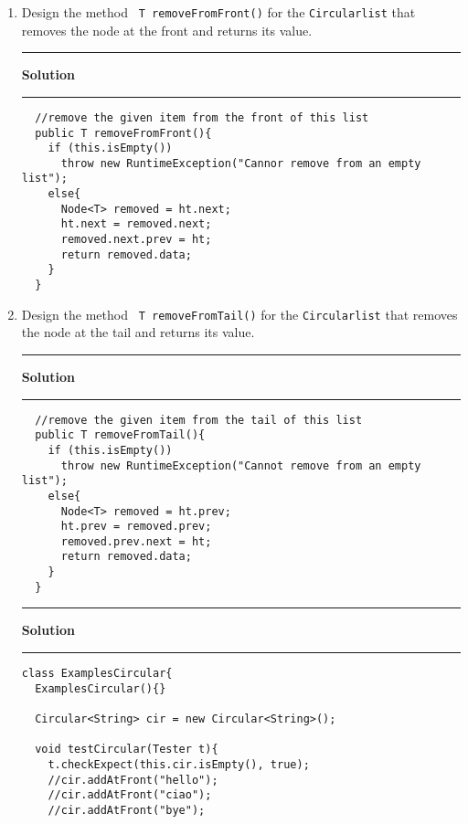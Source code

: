 \documentclass[11pt]{article}
\def\thel{\noindent\rule{2.5cm}{.5pt}}
\def\begsol#1{\thel {\bf Solution} \thel}\def\endsol{\relax}
\newcounter{Pctr}
\newenvironment{problem}{\stepcounter{Pctr}%
\begin{description}
\item[\noindent{\bf Problem} \arabic{Pctr}]
\end{description}}{\relax}
\begin{document}
\begin{problem}
\begin{enumerate}
\begsol{\vspace{0.5in}}
\begin{verbatim}
  //add the given item to the tail of this list
  public void addAtTail(T t){
    Node<T> oldLast = this.ht.prev;
    Node<T> n = new Node<T>(t, oldLast, this.ht);
    this.ht.prev = n;
    oldLast.next = n;
  }
\end{verbatim}
\endsol

\newpage
\item Design the method \texttt{ T removeFromFront()} for the
  \texttt{Circularlist} that removes the node at the front and returns
  its value. 

\begsol{\vspace{0.5in}}
\begin{verbatim}
  //remove the given item from the front of this list
  public T removeFromFront(){
    if (this.isEmpty())
      throw new RuntimeException("Cannor remove from an empty list");
    else{
      Node<T> removed = ht.next;
      ht.next = removed.next;
      removed.next.prev = ht;
      return removed.data;
    }
  }
\end{verbatim}
\endsol

\newpage
\item Design the method \texttt{ T removeFromTail()} for the
  \texttt{Circularlist} that removes the node at the tail and returns
  its value.


\begsol{\vspace{0.5in}}
\begin{verbatim}
  //remove the given item from the tail of this list
  public T removeFromTail(){
    if (this.isEmpty())
      throw new RuntimeException("Cannot remove from an empty list");
    else{
      Node<T> removed = ht.prev;
      ht.prev = removed.prev;
      removed.prev.next = ht;
      return removed.data;
    }
  }
\end{verbatim}
\endsol


\begsol{\vspace{0.5in}}
\begin{verbatim}
class ExamplesCircular{
  ExamplesCircular(){}
  
  Circular<String> cir = new Circular<String>();
  
  void testCircular(Tester t){
    t.checkExpect(this.cir.isEmpty(), true);
    //cir.addAtFront("hello");
    //cir.addAtFront("ciao");
    //cir.addAtFront("bye");
    

\end{verbatim}
\end{enumerate}
\end{problem}
\end{document}
